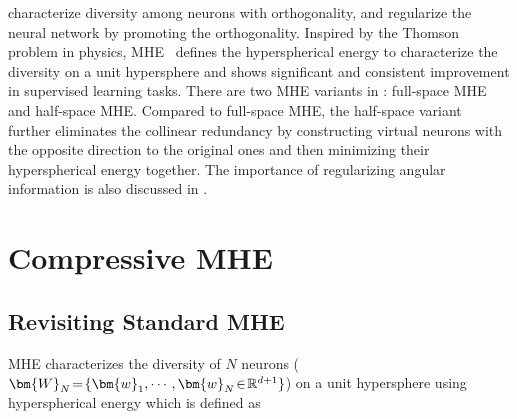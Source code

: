 \cite{cogswell2016reducing,rodriguez2017regularizing,xie2017all,bansal2018can,mishkin2016all,xie2017all} characterize diversity among neurons with orthogonality, and regularize the neural network by promoting the orthogonality. Inspired by the Thomson problem in physics, MHE~\cite{LiuNIPS18} defines the hyperspherical energy to characterize the diversity on a unit hypersphere and shows significant and consistent improvement in supervised learning tasks. There are two MHE variants in \cite{LiuNIPS18}: full-space MHE and half-space MHE. Compared to full-space MHE, the half-space variant~\cite{LiuNIPS18} further eliminates the collinear redundancy by constructing virtual neurons with the opposite direction to the original ones and then minimizing their hyperspherical energy together. The importance of regularizing angular information is also discussed in \cite{liu2016large,liu2017hyper,liu2017sphereface,liu2018decoupled,deng2018arcface,wang2018cosface,wang2017normface,wang2018additive,liu2019neural,mettes2019hyperspherical}.

\section{Compressive MHE}

\subsection{Revisiting Standard MHE}

MHE characterizes the diversity of $N$ neurons ($\thickmuskip=2mu \medmuskip=2mu \bm{W}_N=\{\bm{w}_1,\cdots,\bm{w}_N\in\mathbb{R}^{d+1}\}$) on a unit hypersphere using hyperspherical energy which is defined as

